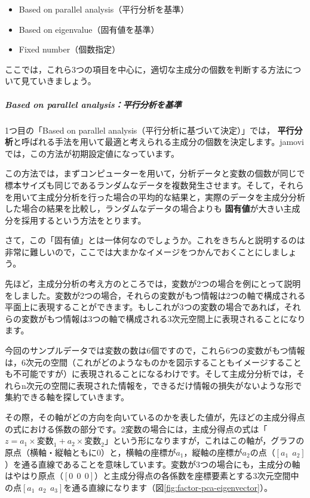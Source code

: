 \documentclass[
  12pt,
  a5jpaper,
  lualatex, ja=standard]{bxjsbook}
\providecommand{\tightlist}{%
  \setlength{\itemsep}{0pt}\setlength{\parskip}{0pt}}
\renewcommand{\emph}[1]{\textbf{\color{emph} #1}}
\newenvironment{jmvsettings}{%
	\begin{center}%
	\begin{tcolorbox}[%
		title=設定項目,
		colframe=gmoji,
		colbacktitle=gmoji,
		colback=gmoji!2!white,
		breakable,
		width=.9\textwidth,
		]\small\addtolength{\leftmargini}{-3\labelsep}%
	}%
	{\end{tcolorbox}\end{center}}
\begin{document}
\begin{jmvsettings}

\begin{itemize}
\tightlist
\item
  Based on parallel analysis（平行分析を基準）
\item
  Based on eigenvalue（固有値を基準）
\item
  Fixed number（個数指定）
\end{itemize}

\end{jmvsettings}

ここでは，これら3つの項目を中心に，適切な主成分の個数を判断する方法について見ていきましょう。

\hypertarget{subsub:factor-pca-component-parallel}{%
\subparagraph*{Based on parallel analysis：平行分析を基準}\label{subsub:factor-pca-component-parallel}}

1つ目の「Based on parallel analysis（平行分析に基づいて決定）」では，\emph{平行分析}と呼ばれる手法を用いて最適と考えられる主成分の個数を決定します。jamoviでは，この方法が初期設定値になっています。

この方法では，まずコンピューターを用いて，分析データと変数の個数が同じで標本サイズも同じであるランダムなデータを複数発生させます。そして，それらを用いて主成分分析を行った場合の平均的な結果と，実際のデータを主成分分析した場合の結果を比較し，ランダムなデータの場合よりも\emph{固有値}が大きい主成分を採用するという方法をとります。

さて，この「固有値」とは一体何なのでしょうか。これをきちんと説明するのは非常に難しいので，ここでは大まかなイメージをつかんでおくことにしましょう。

先ほど，主成分分析の考え方のところでは，変数が2つの場合を例にとって説明をしました。変数が2つの場合，それらの変数がもつ情報は2つの軸で構成される平面上に表現することができます。もしこれが3つの変数の場合であれば，それらの変数がもつ情報は3つの軸で構成される3次元空間上に表現されることになります。

今回のサンプルデータでは変数の数は6個ですので，これら6つの変数がもつ情報は，6次元の空間（これがどのようなものかを図示することもイメージすることも不可能ですが）に表現されることになるわけです。そして主成分分析では，それらn次元の空間に表現された情報を，できるだけ情報の損失がないような形で集約できる軸を探していきます。

その際，その軸がどの方向を向いているのかを表した値が，先ほどの主成分得点の式における係数の部分です。2変数の場合には，主成分得点の式は「\(z=a_1\times\text{変数}_1+a_2\times\text{変数}_2\)」という形になりますが，これはこの軸が，グラフの原点（横軸・縦軸ともに0）と，横軸の座標が\(a_1\)，縦軸の座標が\(a_2\)の点（\([{a_1}\ \ {a_2}]\)）を通る直線であることを意味しています。変数が3つの場合にも，主成分の軸はやはり原点（\([0\ \ 0\ \ 0]\)）と主成分得点の各係数を座標要素とする3次元空間中の点\([{a_1}\ \ {a_2}\ \ {a_3}]\)を通る直線になります（図\ref{fig:factor-pca-eigenvector}）。
\end{document}

